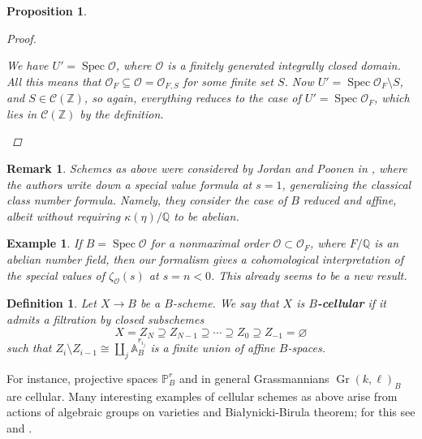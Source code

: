 \documentclass[10pt,a4paper,oneside,draft]{article}
\DeclareMathOperator{\Spec}{Spec}
\newcommand{\QQ}{\mathbb{Q}}
\newcommand{\ZZ}{\mathbb{Z}}
\renewcommand{\AA}{\mathbb{A}}
\newcommand{\PP}{\mathbb{P}}
\DeclareMathOperator{\Gr}{Gr}
\renewcommand{\emptyset}{\varnothing}
\theoremstyle{myplain}
\newtheorem{proposition}[theorem]{Proposition}
\theoremstyle{mydefinition}
\newtheorem{definition}[theorem]{Definition}
\newtheorem{remark}[theorem]{Remark}
\newtheorem{example}[theorem]{Example}
\numberwithin{equation}{section}
\begin{document}
\begin{proposition}
\begin{proof}
\begin{enumerate}
      We have $U' = \Spec \mathcal{O}$, where $\mathcal{O}$ is a finitely
      generated integrally closed domain. All this means that
      $\mathcal{O}_F \subseteq \mathcal{O} = \mathcal{O}_{F,S}$ for some finite
      set $S$. Now $U' = \Spec \mathcal{O}_F \setminus S$, and
      $S \in \mathcal{C} (\ZZ)$, so again, everything reduces to the case of
      $U' = \Spec \mathcal{O}_F$, which lies in $\mathcal{C} (\ZZ)$ by the
      definition. \qedhere
    \end{enumerate}
  \end{proof}
\end{proposition}

\begin{remark}
  Schemes as above were considered by Jordan and Poonen in
  \cite{Jordan-Poonen-2020}, where the authors write down a special value
  formula at $s = 1$, generalizing the classical class number formula. Namely,
  they consider the case of $B$ reduced and affine, albeit without requiring
  $\kappa (\eta)/\QQ$ to be abelian.
\end{remark}

\begin{example}
  If $B = \Spec \mathcal{O}$ for a nonmaximal order
  $\mathcal{O} \subset \mathcal{O}_F$, where $F/\QQ$ is an abelian number field,
  then our formalism gives a cohomological interpretation of the special values
  of $\zeta_\mathcal{O} (s)$ at $s = n < 0$. This already seems to be a new
  result.
\end{example}

\begin{definition}
  \label{dfn:B-cellular-scheme}
  Let $X \to B$ be a $B$-scheme. We say that $X$ is \textbf{$B$-cellular} if it
  admits a filtration by closed subschemes
  \begin{equation}
    \label{eqn:cellular-decomposition}
    X = Z_N \supseteq Z_{N-1} \supseteq \cdots \supseteq Z_0 \supseteq Z_{-1} = \emptyset
  \end{equation}
  such that $Z_i\setminus Z_{i-1} \cong \coprod_j \AA^{r_{i_j}}_B$ is a finite
  union of affine $B$-spaces.
\end{definition}

For instance, projective spaces $\PP^r_B$ and in general Grassmannians
$\Gr (k,\ell)_B$ are cellular. Many interesting examples of cellular schemes as
above arise from actions of algebraic groups on varieties and
Bia\l{}ynicki-Birula theorem; for this see \cite{Wendt-2010} and
\cite{Brosnan-2005}.
\end{document}
